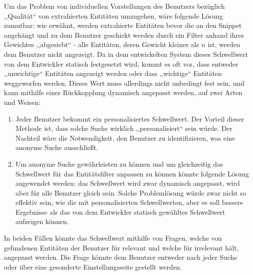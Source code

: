 Um das Problem von individuellen Vorstellungen des Benutzers bezüglich ,,Qualität`` von extrahierten Entitäten umzugehen, wäre folgende Lösung zumutbar: wie erwähnt, werden extrahierte Entitäten bevor die an den Snippet angehängt und zu dem Benutzer geschickt werden durch ein Filter anhand ihres Gewichtes ,,abgesiebt`` - alle Entitäten, deren Gewicht kleiner als $n$ ist, werden dem Benutzer nicht angezeigt. Da in dem entwickelten System dieses Schwellwert von dem Entwickler statisch festgesetzt wird, kommt es oft vor, dass entweder ,,unwichtige`` Entitäten angezeigt werden oder dass ,,wichtige`` Entitäten weggeworfen werden. Dieses Wert muss allerdings nicht unbedingt fest sein, und kann mithilfe einer Rückkopplung dynamisch angepasst werden, auf zwei Arten und Weisen:
\begin{enumerate}
\item Jeder Benutzer bekommt ein personalisiertes Schwellwert. Der Vorteil dieser Methode ist, dass solche Suche wirklich ,,personalisiert`` sein würde. Der Nachteil wäre die Notwendigkeit, den Benutzer zu identifizieren, was eine anonyme Suche ausschließt. 
\item Um anonyme Suche gewährleisten zu können und um gleichzeitig das Schwellwert für das Entitätsfilter anpassen zu können könnte folgende Lösung angewendet werden: das Schwellwert wird zwar dynamisch angepasst, wird aber für alle Benutzer gleich sein. Solche Problemlösung würde zwar nicht so effektiv sein, wie die mit personalisierten Schwellwerten, aber es soll bessere Ergebnisse als das von dem Entwickler statisch gewähltes Schwellwert aufzeigen können.
\end{enumerate}
In beiden Fällen könnte das Schwellwert mithilfe von Fragen, welche von gefundenen Entitäten der Benutzer für relevant und welche für irrelevant hält, angepasst werden. Die Frage könnte dem Benutzer entweder nach jeder Suche oder über eine gesonderte Einstellungsseite gestellt werden.
